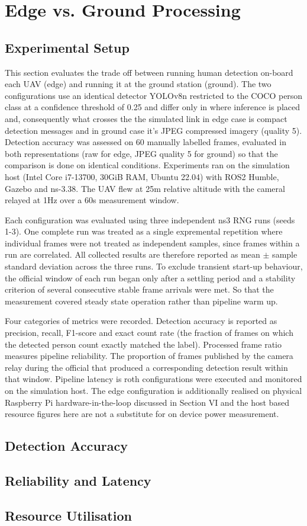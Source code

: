 \section{Edge vs. Ground Processing}

\subsection{Experimental Setup}

This section evaluates the trade off between running human detection on-board each UAV (edge) and running it at the ground station (ground). The two configurations use an identical detector YOLOv8n restricted to the COCO person class at a confidence threshold of 0.25 and differ only in where inference is placed and, consequently what crosses the the simulated link in edge case is compact detection messages and in ground case it's JPEG compressed imagery (quality 5). Detection accuracy was assessed on $60$ manually labelled frames, evaluated in both representations (raw for edge, JPEG quality 5 for ground) so that the comparison is done on identical conditions. Experiments ran on the simulation host (Intel Core i7-13700, 30GiB RAM, Ubuntu 22.04) with ROS2 Humble, Gazebo and ns-3.38. The UAV flew at 25m relative altitude with the cameral relayed at 1Hz over a 60s measurement window.

Each configuration was evaluated using three independent ns3 RNG runs (seeds 1-3). One complete run was treated as a single expremental repetition where individual frames were not treated as independent samples, since frames within a run are correlated. All collected results are therefore reported as mean $\pm$ sample standard deviation across the three runs. To exclude transient start-up behaviour, the official window of each run began only after a settling period and a stability criterion of several consecutive stable frame arrivals were met. So that the measurement covered steady state operation rather than pipeline warm up. 

Four categories of metrics were recorded. Detection accuracy is reported as precision, recall, F1-score and exact count rate (the fraction of frames on which the detected person count exactly matched the label). Processed frame ratio measures pipeline reliability. The proportion of frames published by the camera relay during the official that produced a corresponding detection result within that window. Pipeline latency is roth configurations were executed and monitored on the simulation host. The edge configuration is additionally realised on physical Raspberry Pi hardware-in-the-loop discussed in Section VI and the host based resource figures here are not a substitute for on device power measurement. 


\subsection{Detection Accuracy}



\subsection{Reliability and Latency}



\subsection{Resource Utilisation}


